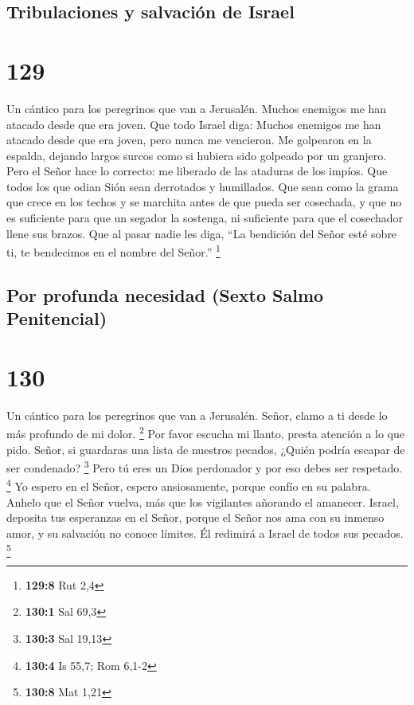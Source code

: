 \hypertarget{tribulaciones-y-salvaciuxf3n-de-israel}{%
\subsection{Tribulaciones y salvación de
Israel}\label{tribulaciones-y-salvaciuxf3n-de-israel}}

\hypertarget{section-128}{%
\section{129}\label{section-128}}

Un cántico para los peregrinos que van a Jerusalén.  Muchos
enemigos me han atacado desde que era joven. Que todo Israel diga:
 Muchos enemigos me han atacado desde que era joven, pero
nunca me vencieron.  Me golpearon en la espalda, dejando
largos surcos como si hubiera sido golpeado por un granjero.
 Pero el Señor hace lo correcto: me liberado de las ataduras
de los impíos.  Que todos los que odian Sión sean derrotados
y humillados.  Que sean como la grama que crece en los
techos y se marchita antes de que pueda ser cosechada,  y
que no es suficiente para que un segador la sostenga, ni suficiente para
que el cosechador llene sus brazos.  Que al pasar nadie les
diga, ``La bendición del Señor esté sobre ti, te bendecimos en el nombre
del Señor.'' \footnote{\textbf{129:8} Rut 2,4}

\hypertarget{por-profunda-necesidad-sexto-salmo-penitencial}{%
\subsection{Por profunda necesidad (Sexto Salmo
Penitencial)}\label{por-profunda-necesidad-sexto-salmo-penitencial}}

\hypertarget{section-129}{%
\section{130}\label{section-129}}

Un cántico para los peregrinos que van a Jerusalén.  Señor,
clamo a ti desde lo más profundo de mi dolor. \footnote{\textbf{130:1}
  Sal 69,3}  Por favor escucha mi llanto, presta atención a
lo que pido.  Señor, si guardaras una lista de nuestros
pecados, ¿Quién podría escapar de ser condenado? \footnote{\textbf{130:3}
  Sal 19,13}  Pero tú eres un Dios perdonador y por eso
debes ser respetado. \footnote{\textbf{130:4} Is 55,7; Rom 6,1-2}
 Yo espero en el Señor, espero ansiosamente, porque confío
en su palabra.  Anhelo que el Señor vuelva, más que los
vigilantes añorando el amanecer.  Israel, deposita tus
esperanzas en el Señor, porque el Señor nos ama con su inmenso amor, y
su salvación no conoce límites.  Él redimirá a Israel de
todos sus pecados. \footnote{\textbf{130:8} Mat 1,21}

